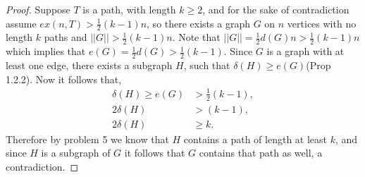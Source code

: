 \documentclass[12pt]{article}
\begin{document}
\begin{enumerate}
\begin{proof}
	Suppose $T$ is a path, with length $k \geq 2$, and for the sake of contradiction assume $ex(n, T) > \frac{1}{2}(k - 1)n$, so there exists a graph $G$ on $n$ vertices with no length $k$ paths and $||G|| > \frac{1}{2}(k - 1)n$. Note that $||G|| = \frac{1}{2}d(G)n > \frac{1}{2}(k - 1)n$ which implies that $e(G) = \frac{1}{2}d(G) > \frac{1}{2}(k - 1)$. Since $G$ is a graph with at least one edge, there exists a subgraph $H$, such that $\delta(H) \geq e(G)$(Prop 1.2.2). Now it follows that,
	\begin{align*}
		\delta(H) \geq e(G) &> \frac{1}{2}(k - 1),\\
		2\delta(H) &> (k - 1),\\
		2\delta(H) &\geq k.
	\end{align*}
	Therefore by problem 5 we know that $H$ contains a path of length at least $k$, and since $H$ is a subgraph of $G$ it follows that $G$ contains that path as well, a contradiction.
	








\end{proof}
\end{enumerate}
\end{document}

